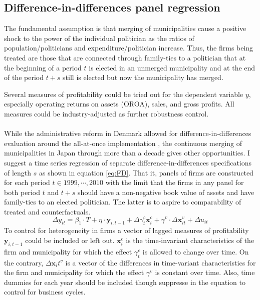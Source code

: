 \label{sec:empirics}
\subsection{Difference-in-differences panel regression}
The fundamental assumption is that merging of municipalities cause a positive shock to the power of the individual politician as the ratios of population/politicians and expenditure/politician increase. Thus, the firms being treated are those that are connected through family-ties to a politician that at the beginning of a period $t$ is elected in an unmerged municipality and at the end of the period $t+s$ still is elected but now the municipality has merged.

Several measures of profitability could be tried out for the dependent variable $y$, especially operating returns on assets (OROA), sales, and gross profits. All measures could be industry-adjusted as further robustness control.
\\ \\
While the administrative reform in Denmark allowed for difference-in-differences evaluation around the all-at-once implementation \citep{amore2013value}, the continuous merging of municipalities in Japan through more than a decade gives other opportunities. I suggest a time series regression of separate difference-in-differences specifications of length $s$ as shown in equation \ref{eq:FD}. That it, panels of firms are constructed for each period $t\in 1999,\cdots,2010$ with the limit that the firms in any panel for both period $t$ and $t+s$ should have a non-negative book value of assets and have family-ties to an elected politician. The latter is to aspire to comparability of treated and counterfactuals.
\begin{equation}
  \Delta y_{it} = \beta_1\cdot T + \eta\cdot \bm{y}_{i,t-1} + \Delta\gamma_t^c \bm{x}_{i}^c + \gamma^v\cdot\Delta\bm{x}_{it}^v + \Delta u_{it}
  \label{eq:FD}
\end{equation}
To control for heterogeneity in firms a vector of lagged measures of profitability $\bm{y}_{i,t-1}$  could be included or left out. $\bm{x}_i^c$ is the time-invariant characteristics of the firm and municipality for which the effect $\gamma_t^c$ is allowed to change over time. On the contrary, $\Delta \bm{x}_it^v$ is a vector of the differences in time-variant characteristics for the firm and municipality for which the effect $\gamma^v$ is constant over time. Also, time dummies for each year should be included though suppresse in the equation to control for business cycles.

